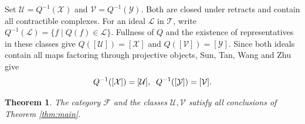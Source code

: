 \documentclass[11pt,a4paper,reqno]{amsart}
\newcommand{\Tcal}{\mathcal T}
\newcommand{\Xcal}{\mathcal X}
\theoremstyle{plain}
\newtheorem{theorem}{Theorem}[section]
\theoremstyle{definition}
\theoremstyle{remark}
\newcommand{\Fcal}{\mathcal F}
\newcommand{\Ycal}{\mathcal Y}
\newcommand{\Ucal}{\mathcal U}
\newcommand{\Vcal}{\mathcal V}
\begin{document}
Set $\Ucal=Q^{-1}(\Xcal)$ and $\Vcal=Q^{-1}(\Ycal)$. Both are closed under retracts and contain all contractible complexes. For an ideal $\mathcal L$ in $\Tcal$, write $Q^{-1}(\mathcal L)=\{f\mid Q(f)\in\mathcal L\}$. Fullness of $Q$ and the existence of representatives in these classes give $Q([\Ucal])=[\Xcal]$ and $Q([\Vcal])=[\Ycal]$. Since both ideals contain all maps factoring through projective objects, Sun, Tan, Wang and Zhu \cite[Lemma~3.2]{STWZ25} give
\begin{equation}\label{eq:lifted-ideals}
Q^{-1}([\Xcal])=[\Ucal],
\hspace{2mm}
Q^{-1}([\Ycal])=[\Vcal].
\end{equation}

\begin{theorem}\label{thm:exact}
The category $\Fcal$ and the classes $\Ucal,\Vcal$ satisfy all conclusions of Theorem \ref{thm:main}.
\end{theorem}
\end{document}
